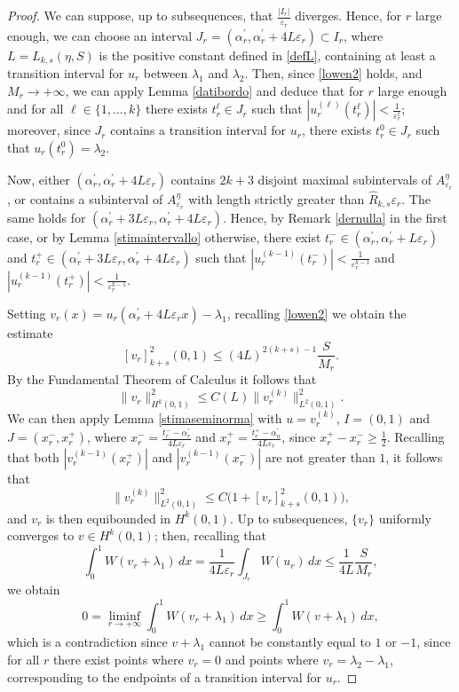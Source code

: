 \documentclass{article}
\newcommand{\e}{\varepsilon}
\begin{document}
\begin{proof}
\noindent {\em Case $2$: $\sup_{r}\frac{|I_r|}{\e_r}=+\infty$.} 

\smallskip
We can suppose, up to subsequences, that $\frac{|I_r|}{\e_r}$ diverges. 
Hence, for $r$ large enough, 
we can choose an interval $J_r=(\alpha^\prime_r, \alpha^\prime_r+4L\e_r)\subset I_r$, where $L=L_{k,s}(\eta, S)$ is the positive constant defined in \eqref{defL}, containing at least a transition interval for $u_r$ between $\lambda_1$ and $\lambda_2$.  
Then, since \eqref{lowen2} holds, and $M_r\to+\infty$, we can apply Lemma \ref{datibordo} and deduce that for $r$ large enough and for all $\ell\in\{1,\dots, k\}$ there exists $t^\ell_r\in J_r$ such that 
$|u_r^{(\ell)}(t^\ell_r)|<\frac{1}{\e_r^{\ell}}$; moreover, since $J_r$ contains a transition interval for $u_r$, there exists $t_r^0\in J_r$ such that   $u_r(t_r^0)=\lambda_2$. 

Now,  either $(\alpha^\prime_r, \alpha^\prime_r+4L\e_r)$ contains $2k+3$ disjoint maximal subintervals of $A_{\e_r}^\eta$, or contains a subinterval of $A_{\e_r}^\eta$ with length strictly greater than $\widehat R_{k,s}\e_r$. The same holds for $(\alpha^\prime_r+3L\e_r, \alpha^\prime_r+4L\e_r)$. Hence, by Remark \ref{dernulla} in the first case, or by Lemma \ref{stimaintervallo} otherwise, there exist $t_r^-\in (\alpha^\prime_r, \alpha^\prime_r+L\e_r)$ and $t_r^+\in (\alpha^\prime_r+3L\e_r, \alpha^\prime_r+4L\e_r)$ such that $|u_r^{(k-1)}(t_r^-)|<\frac{1}{\e_r^{k-1}}$ and $|u_r^{(k-1)}(t_r^+)|<\frac{1}{\e_r^{k-1}}$. 

Setting $v_r(x)=u_r(\alpha_r^\prime+4L\e_r x)-\lambda_1$, recalling \eqref{lowen2} we obtain the estimate 
\begin{equation}\label{stisem2}
[v_r]^2_{k+s}(0,1)
\leq (4L)^{2(k+s)-1}\frac{S}{M_r}. 
\end{equation} 
By the Fundamental Theorem of Calculus it follows that 
$$\|v_r\|^2_{H^k(0,1)}\leq C(L) \|v_r^{(k)}\|_{L^2(0,1)}^2.$$ 
We can then apply Lemma \ref{stimaseminorma} with $u=v_r^{(k)}$, $I=(0,1)$ and  $J=(x_r^-,x_r^+)$, 
where  
$x_r^-=\frac{t_r^--\alpha_r^\prime}{4L\e_r}$ and 
$x_r^+=\frac{t_r^+-\alpha_n^\prime}{4L\e_r}$,  
since $x_r^+-x_r^-\geq \frac{1}{2}$.  
Recalling that both $|v_r^{(k-1)}(x_r^+)|$ and $|v_r^{(k-1)}(x_r^-)|$ are not greater than $1$, it follows that  
$$\|v_r^{(k)}\|_{L^2(0,1)}^2\leq C \Big(1+[v_r]^2_{k+s}(0,1)\Big),$$
and $v_r$ is then equibounded in $H^k(0,1)$. 
Up to subsequences, $\{v_r\}$ uniformly converges to $v\in H^k(0,1)$;  
then, recalling that 
\begin{equation}\label{stiW}
\int_{0}^1 W(v_r+\lambda_1)\, dx=\frac{1}{4L\e_r}\int_{J_r} W(u_r)\, dx\leq \frac{1}{4L}\frac{S}{M_r},  
\end{equation}
we obtain 
\begin{equation}\label{assurdo2}
0=\liminf_{r\to+\infty}\int_{0}^1 W(v_r+\lambda_1)\, dx\geq \int_{0}^1 W(v+\lambda_1)\, dx,  
\end{equation}
which is a contradiction since $v+\lambda_1$ cannot be constantly equal to $1$ or $-1$, since for all $r$ there exist points where $v_r=0$ and  points where $v_r=\lambda_2-\lambda_1$, corresponding to the endpoints of a transition interval for $u_r$.
\end{proof}
\end{document}
